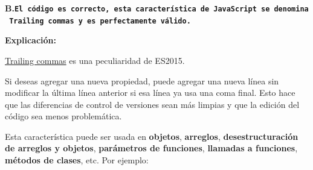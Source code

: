 \documentclass[
  letterpaper,
  DIV=11,
  numbers=noendperiod]{scrreprt}
\newenvironment{Shaded}{\begin{snugshade}}{\end{snugshade}}
\newcommand{\BuiltInTok}[1]{\textcolor[rgb]{0.00,0.23,0.31}{#1}}
\newcommand{\CommentTok}[1]{\textcolor[rgb]{0.37,0.37,0.37}{#1}}
\newcommand{\ControlFlowTok}[1]{\textcolor[rgb]{0.00,0.23,0.31}{\textbf{#1}}}
\newcommand{\DataTypeTok}[1]{\textcolor[rgb]{0.68,0.00,0.00}{#1}}
\newcommand{\DecValTok}[1]{\textcolor[rgb]{0.68,0.00,0.00}{#1}}
\newcommand{\FunctionTok}[1]{\textcolor[rgb]{0.28,0.35,0.67}{#1}}
\newcommand{\KeywordTok}[1]{\textcolor[rgb]{0.00,0.23,0.31}{\textbf{#1}}}
\newcommand{\NormalTok}[1]{\textcolor[rgb]{0.00,0.23,0.31}{#1}}
\newcommand{\OperatorTok}[1]{\textcolor[rgb]{0.37,0.37,0.37}{#1}}
\newcommand{\SpecialCharTok}[1]{\textcolor[rgb]{0.37,0.37,0.37}{#1}}
\newcommand{\StringTok}[1]{\textcolor[rgb]{0.13,0.47,0.30}{#1}}
\newcommand{\VerbatimStringTok}[1]{\textcolor[rgb]{0.13,0.47,0.30}{#1}}
\begin{document}
\textbf{B.\texttt{El\ código\ es\ correcto,\ esta\ característica\ de\ JavaScript\ se\ denomina\ Trailing\ commas\ y\ es\ perfectamente\ válido.}}

\textbf{Explicación:}

\hyperref[glos-trailing_commas]{Trailing commas} es una peculiaridad de
ES2015.

Si deseas agregar una nueva propiedad, puede agregar una nueva línea sin
modificar la última línea anterior si esa línea ya usa una coma final.
Esto hace que las diferencias de control de versiones sean más limpias y
que la edición del código sea menos problemática.

Esta característica puede ser usada en \textbf{objetos},
\textbf{arreglos}, \textbf{desestructuración de arreglos y objetos},
\textbf{parámetros de funciones}, \textbf{llamadas a funciones},
\textbf{métodos de clases}, etc. Por ejemplo:

\begin{Shaded}
\end{Shaded}
\end{document}
